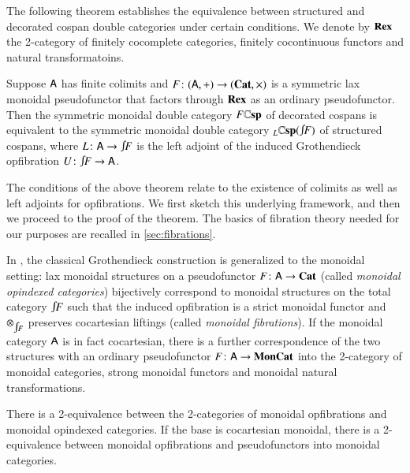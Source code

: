 \documentclass[reqno]{amsart}
\begin{document}
The following theorem establishes the equivalence between structured and decorated cospan double categories under certain conditions.  We denote by $\mathbf{Rex}$ the 2-category of finitely cocomplete categories, finitely cocontinuous functors and natural transformatoins.

\begin{thm} \label{thm:equiv}
Suppose $\mathsf{A}$ has finite colimits and $F \colon(\mathsf{A},+) \to (\mathbf{Cat},\times)$ is a symmetric lax monoidal pseudofunctor that factors through $\mathbf{Rex}$ as an ordinary pseudofunctor.   Then the symmetric monoidal double category $F\mathbf{\mathbb Csp}$ of decorated cospans is equivalent to the symmetric monoidal double category $_L\lCsp(\inta F)$ of structured cospans, where $L \maps \A \to \inta F$ is the left adjoint of the induced Grothendieck opfibration $U \maps \inta F \to \A$.
\end{thm}

The conditions of the above theorem relate to the existence of colimits as well as left adjoints for opfibrations. We first sketch this underlying framework, and then we proceed to the proof of the theorem. The basics of fibration theory needed for our purposes are recalled in \cref{sec:fibrations}. 

In \cite{MV}, the classical Grothendieck construction is generalized to the monoidal setting: lax monoidal structures on a pseudofunctor $F\colon\mathsf{A}\to\mathbf{Cat}$ (called \emph{monoidal opindexed categories}) bijectively correspond to monoidal structures on the total category $\inta F$ such that the induced opfibration is a strict monoidal functor and $\otimes_{\inta F}$ preserves cocartesian liftings (called \emph{monoidal fibrations}). If the monoidal category $\mathsf{A}$ is in fact cocartesian, there is a further correspondence of the two structures with an ordinary pseudofunctor $F\colon\mathsf{A}\to\mathbf{MonCat}$ into the 2-category of monoidal categories, strong monoidal functors and monoidal natural transformations.

\begin{lem}\label{lem:MonGroth}
 There is a 2-equivalence between the 2-categories of monoidal opfibrations and monoidal opindexed categories. If the base is cocartesian monoidal, there is a 2-equivalence between monoidal opfibrations and pseudofunctors into monoidal categories. 
\end{lem}
\end{document}
